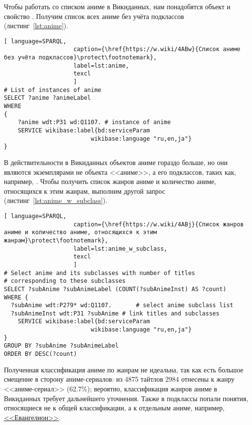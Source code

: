 Чтобы работать со списком аниме в Викиданных, нам понадобятся объект  и свойство . Получим список всех аниме без учёта подклассов (листинг~\protect\ref{lst:anime}).

\begin{lstlisting}[ language=SPARQL, 
                    caption={\href{https://w.wiki/4ABw}{Список аниме без учёта подклассов}\protect\footnotemark},
                    label=lst:anime,
                    texcl 
                    ]
# List of instances of anime
SELECT ?anime ?animeLabel
WHERE
{
    ?anime wdt:P31 wd:Q1107. # instance of anime
    SERVICE wikibase:label{bd:serviceParam
					     wikibase:language "ru,en,ja"}
}
\end{lstlisting}%

В действительности в Викиданных объектов аниме гораздо больше, но они являются экземплярами не объекта <<аниме>>, а его подклассов, таких как, например, . Чтобы получить список жанров аниме и количество аниме, относящихся к этим жанрам, выполним другой запрос (листинг~\protect\ref{lst:anime_w_subclass}).

\begin{lstlisting}[ language=SPARQL, 
                    caption={\href{https://w.wiki/4ABj}{Список жанров аниме и количество аниме, относящихся к этим жанрам}\protect\footnotemark},
                    label=lst:anime_w_subclass,
                    texcl 
                    ]
# Select anime and its subclasses with number of titles
# corresponding to these subclasses
SELECT ?subAnime ?subAnimeLabel (COUNT(?subAnimeInst) AS ?count)
WHERE {
  ?subAnime wdt:P279* wd:Q1107.       # select anime subclass list
  ?subAnimeInst wdt:P31 ?subAnime # link titles and subclasses
    SERVICE wikibase:label{bd:serviceParam
					     wikibase:language "ru,en,ja"}
}
GROUP BY ?subAnime ?subAnimeLabel
ORDER BY DESC(?count)
\end{lstlisting}%

Полученная классификация аниме по жанрам не идеальна, так как есть большое смещение в сторону аниме-сериалов: из 4875 тайтлов 2984 отнесены к жанру <<аниме-сериал>> (\num{62,7}\%); вероятно, классификация жанров аниме в Викиданных требует дальнейшего уточнения. Также в подклассы попали понятия, относящиеся не к общей классификации, а к отдельным аниме, например, \href{https://w.wiki/4L5p}{<<Евангелион>>}.

